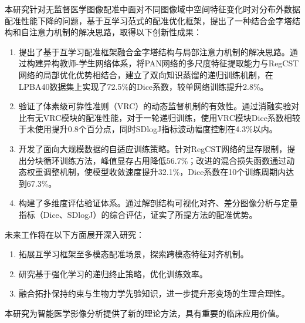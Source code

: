 \begin{conclusions}



本研究针对无监督医学图像配准中面对不同图像域中空间特征变化时对分布外数据配准性能下降的问题，基于互学习范式的配准优化框架，提出了一种结合金字塔结构和自注意力机制的解决思路，取得以下创新性成果：

\begin{enumerate}
    \item 提出了基于互学习配准框架融合金字塔结构与局部注意力机制的解决思路。通过构建异构教师-学生网络体系，将PAN网络的多尺度特征提取能力与RegCST网络的局部优化优势相结合，建立了双向知识蒸馏的递归训练机制，在LPBA40数据集上实现了72.5\%的Dice系数，较单网络训练提升2.8\%。
    \item 验证了体素级可靠性准则（VRC）的动态监督机制的有效性。通过消融实验对比有无VRC模块的配准性能，对于一轮递归训练，使用VRC模块Dice系数相较于未使用提升0.8个百分点，同时SDlogJ指标波动幅度控制在4.3\%以内。
    \item 开发了面向大规模数据的自适应训练策略。针对RegCST网络的显存限制，提出分块循环训练方法，峰值显存占用降低56.7\%；改进的混合损失函数通过动态权重调整机制，使模型收敛速度提升32.1\%，Dice系数在10个训练周期内达到67.3\%。
    \item 构建了多维度评估验证体系。通过解剖结构可视化对齐、差分图像分析与定量指标（Dice、SDlogJ）的综合评估，证实了所提方法的配准优势。
\end{enumerate}

未来工作将在以下方面展开深入研究：

\begin{enumerate}
    \item 拓展互学习框架至多模态配准场景，探索跨模态特征对齐机制。
    \item 研究基于强化学习的递归终止策略，优化训练效率。
    \item 融合拓扑保持约束与生物力学先验知识，进一步提升形变场的生理合理性。
\end{enumerate}

本研究为智能医学影像分析提供了新的理论方法，具有重要的临床应用价值。

\end{conclusions}
